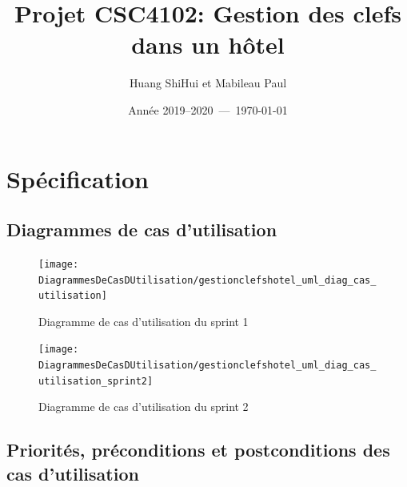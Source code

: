 \documentclass[11pt,article]{article}
\begin{document}
\title{Projet CSC4102: Gestion des clefs dans un hôtel}
\author{Huang ShiHui et Mabileau Paul}
\date{Année 2019--2020~---~\today}
\maketitle

\newpage

\tableofcontents

\newpage

\section{Spécification}

\subsection{Diagrammes de cas d'utilisation}

\begin{figure}[h!]
  \texttt{[image: DiagrammesDeCasDUtilisation/gestionclefshotel\_uml\_diag\_cas\_utilisation]}
  \caption{Diagramme de cas d'utilisation du sprint 1 }
  \label{umlet_diag_cas_utilisation_du_sprint_1}
\end{figure}


\begin{figure}[h!]
  \texttt{[image: DiagrammesDeCasDUtilisation/gestionclefshotel\_uml\_diag\_cas\_utilisation\_sprint2]}
  \caption{Diagramme de cas d'utilisation du sprint 2}
  \label{umlet_diag_cas_utilisation_du_sprint_2}
\end{figure}

\newpage

\subsection{Priorités, préconditions et postconditions des cas d'utilisation}
\end{document}
